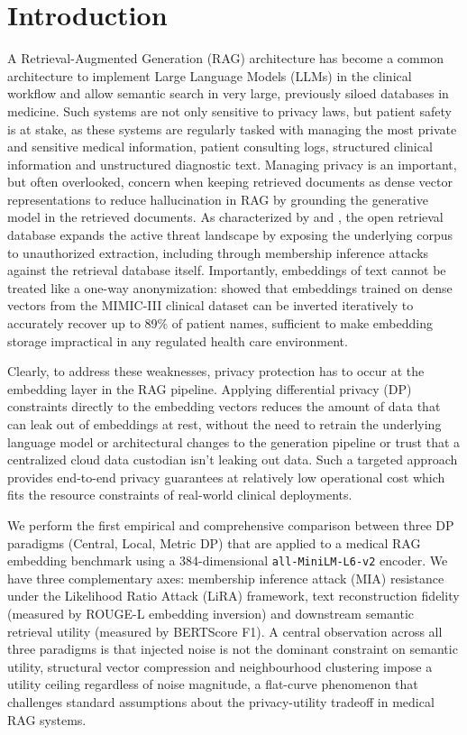 \documentclass[11pt, a4paper]{article}
\begin{document}
\section{Introduction}

A Retrieval-Augmented Generation (RAG) architecture has become a common architecture to
implement Large Language Models (LLMs) in the clinical workflow and allow semantic search in
very large, previously siloed databases in medicine. Such systems are not only sensitive to
privacy laws, but patient safety is at stake, as these systems are regularly tasked with
managing the most private and sensitive medical information, patient consulting logs,
structured clinical information and unstructured diagnostic text. Managing privacy is an
important, but often overlooked, concern when keeping retrieved documents as dense vector
representations to reduce hallucination in RAG by grounding the generative model in the
retrieved documents. As characterized by \citet{zeng2024} and \citet{anderson2025}, the open 
retrieval database expands the active threat landscape by exposing the 
underlying corpus to unauthorized extraction, including through membership 
inference attacks against the retrieval database itself. Importantly, embeddings of text cannot be treated like a one-way anonymization:
\citet{morris2023} showed that embeddings trained on dense vectors from the MIMIC-III
clinical dataset can be inverted iteratively to accurately recover up to 89\% of patient
names, sufficient to make embedding storage impractical in any regulated health care
environment.

Clearly, to address these weaknesses, privacy protection has to occur at the embedding layer
in the RAG pipeline. Applying differential privacy (DP) constraints directly to the embedding
vectors reduces the amount of data that can leak out of embeddings at rest, without the need
to retrain the underlying language model or architectural changes to the generation pipeline
or trust that a centralized cloud data custodian isn't leaking out data. Such a targeted
approach provides end-to-end privacy guarantees at relatively low operational cost which fits
the resource constraints of real-world clinical deployments.

We perform the first empirical and comprehensive comparison between three DP paradigms
(Central, Local, Metric DP) that are applied to a medical RAG embedding benchmark using a
384-dimensional \texttt{all-MiniLM-L6-v2} encoder. We have three complementary axes:
membership inference attack (MIA) resistance under the Likelihood Ratio Attack (LiRA)
framework, text reconstruction fidelity (measured by ROUGE-L embedding inversion) and
downstream semantic retrieval utility (measured by BERTScore F1). A central observation
across all three paradigms is that injected noise is not the dominant constraint on semantic
utility, structural vector compression and neighbourhood clustering impose a utility
ceiling regardless of noise magnitude, a flat-curve phenomenon that challenges standard
assumptions about the privacy-utility tradeoff in medical RAG systems.
\end{document}

